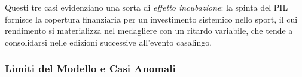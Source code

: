 




Questi tre casi evidenziano una sorta di \textit{effetto incubazione}: la spinta
del PIL fornisce la copertura finanziaria per un investimento sistemico nello
sport, il cui rendimento si materializza nel medagliere con un ritardo
variabile, che tende a consolidarsi nelle edizioni successive all'evento
casalingo.


\subsubsection{Limiti del Modello e Casi Anomali}






